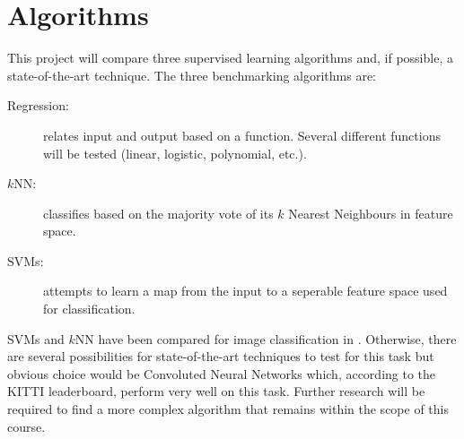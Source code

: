 \documentclass[a4paper,10pt]{article}
\begin{document}
\section{Algorithms}
This project will compare three supervised learning algorithms and, if possible, a state-of-the-art technique. The three benchmarking algorithms are:
\begin{description}
 \item[Regression:] relates input and output based on a function. Several different functions will be tested (linear, logistic, polynomial, etc.).
 \item[$k$NN:] classifies based on the majority vote of its $k$ Nearest Neighbours in feature space.
 \item[SVMs:] attempts to learn a map from the input to a seperable feature space used for classification.
\end{description}

SVMs and $k$NN have been compared for image classification in \cite{comparing2012}. Otherwise, there are several possibilities for state-of-the-art techniques to test for this task but obvious choice would be Convoluted Neural Networks which, according to the KITTI leaderboard, perform very well on this task\cite{imagenet2012, deep2014}. Further research will be required to find a more complex algorithm that remains within the scope of this course.



\end{document}
